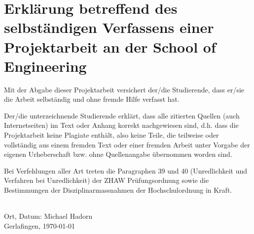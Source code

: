 
\chapter*{Erklärung betreffend des selbständigen Verfassens einer Projektarbeit an der School of Engineering}

Mit der Abgabe dieser Projektarbeit versichert der/die Studierende, dass er/sie die Arbeit selbständig und ohne fremde Hilfe verfasst hat.

Der/die unterzeichnende Studierende erklärt, dass alle zitierten Quellen (auch Internetseiten) im Text oder Anhang korrekt nachgewiesen sind, d.h. dass die Projektarbeit keine Plagiate enthält, also keine Teile, die teilweise oder vollständig aus einem fremden Text oder einer fremden Arbeit unter Vorgabe der eigenen Urheberschaft bzw. ohne Quellenangabe übernommen worden sind.

Bei Verfehlungen aller Art treten die Paragraphen 39 und 40 (Unredlichkeit und Verfahren bei Unredlichkeit) der ZHAW Prüfungsordnung sowie die Bestimmungen der Disziplinarmassnahmen der Hochschulordnung in Kraft.

%
\mbox{}\vspace{4\baselineskip}\\
%
Ort, Datum: \hfill Michael Hadorn\\
Gerlafingen, \today



%

